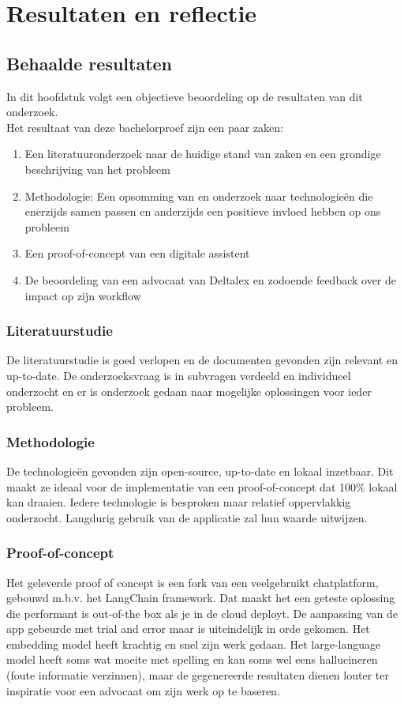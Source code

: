 \chapter{Resultaten en reflectie}
\label{ch:results_reflection}
\section{Behaalde resultaten}
In dit hoofdstuk volgt een objectieve beoordeling op de resultaten van dit onderzoek. \\

Het resultaat van deze bachelorproef zijn een paar zaken:

\begin{enumerate}
	\item Een literatuuronderzoek naar de huidige stand van zaken en een grondige beschrijving van het probleem
	\item Methodologie: Een opsomming van en onderzoek naar technologieën die enerzijds samen passen en anderzijds een positieve invloed hebben op ons probleem
	\item Een proof-of-concept van een digitale assistent
	\item De beoordeling van een advocaat van Deltalex en zodoende feedback over de impact op zijn workflow
\end{enumerate}

\subsection{Literatuurstudie}
De literatuurstudie is goed verlopen en de documenten gevonden zijn relevant en up-to-date.
De onderzoeksvraag is in subvragen verdeeld en individueel onderzocht en er is onderzoek gedaan naar mogelijke oplossingen voor ieder probleem.

\subsection{Methodologie}
De technologieën gevonden zijn open-source, up-to-date en lokaal inzetbaar.
Dit maakt ze ideaal voor de implementatie van een proof-of-concept dat 100\% lokaal kan draaien.
Iedere technologie is besproken maar relatief oppervlakkig onderzocht.
Langdurig gebruik van de applicatie zal hun waarde uitwijzen.

\subsection{Proof-of-concept}
Het geleverde proof of concept is een fork van een veelgebruikt chatplatform, gebouwd m.b.v. het LangChain framework.
Dat maakt het een geteste oplossing die performant is out-of-the box als je in de cloud deployt.
De aanpassing van de app gebeurde met trial and error maar is uiteindelijk in orde gekomen.
Het embedding model heeft krachtig en snel zijn werk gedaan.
Het large-language model heeft soms wat moeite met spelling en kan soms wel eens hallucineren (foute informatie verzinnen),
maar de gegenereerde resultaten dienen louter ter inspiratie voor een advocaat om zijn werk op te baseren.


